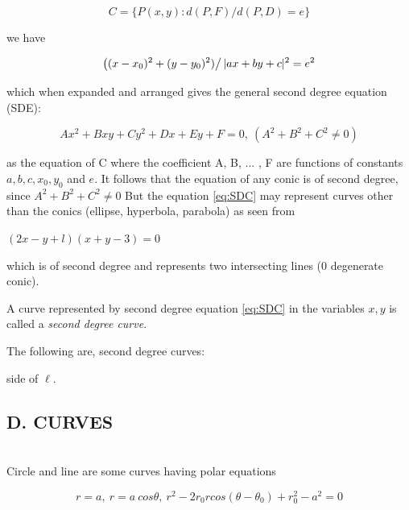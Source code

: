 \documentclass[11pt]{amsbook}
\begin{document}
  \begin{equation}
  C = \{P(x,y):d(P,F)/d(P,D) = e\}
  \end{equation}

we have

  \begin{equation}
  \left( (x-x_0)^2 + (y-y_0)^2 )\right/ |ax+by+c|^2 = e^2
  \end{equation}
  
which when expanded and arranged gives the general second degree equation (SDE):

	\begin{equation}
    \label{eq:SDC}
	Ax^2 + Bxy + Cy^2 + Dx + Ey + F = 0, \ (A^2 + B^2 + C^2 \neq 0)
	\end{equation}

as the equation of C where the coefficient A, B, ... , F are functions of constants $a, b, c, x_0, y_0$ and $e$. It follows that the equation of any conic is of second degree, since $A^2 + B^2 + C^2 \neq 0$ But the equation \eqref{eq:SDC} may represent curves other than the conics (ellipse, hyperbola, parabola) as seen from

  \begin{center}
  $(2x - y + l)(x + y - 3) = 0$ %
  \end{center}

which is of second degree and represents two intersecting lines (0 degenerate conic). %

A curve represented by second degree equation \eqref{eq:SDC} in the variables $x, y$ is called a \textit{second degree curve}. %

The following are, second degree curves: 
    \begin{flushleft}
    side of $\ell$.
    \end{flushleft}

    \subsection*{D. CURVES} \hfill\\
    
    Circle and line are some curves having polar equations
    
    \begin{equation*}
         r=a,\ r=a\ cos\theta,\ r^2 -2r_{0}r cos(\theta-\theta_{0}) + r_{0}^2 -a^2=0
    \end{equation*}
    
\end{document}
